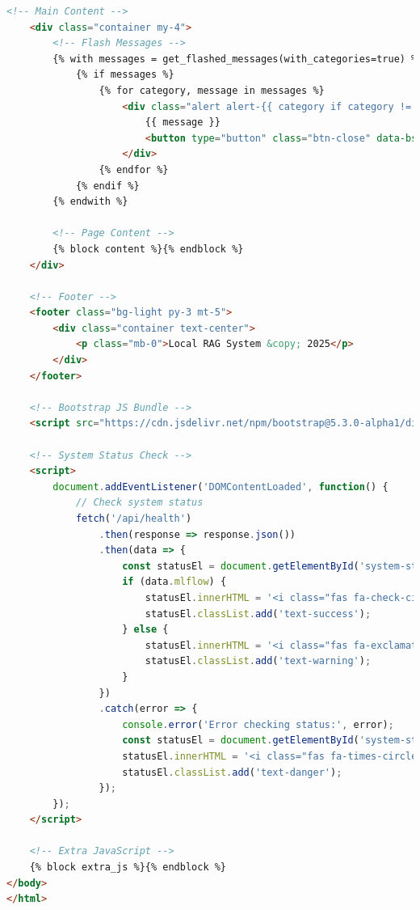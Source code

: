 \documentclass[
  screen,review,acmlarge]{acmart}
\begin{document}
\begin{lstlisting}[language=HTML]
    <!-- Main Content -->
    <div class="container my-4">
        <!-- Flash Messages -->
        {% with messages = get_flashed_messages(with_categories=true) %}
            {% if messages %}
                {% for category, message in messages %}
                    <div class="alert alert-{{ category if category != 'message' else 'info' }} alert-dismissible fade show">
                        {{ message }}
                        <button type="button" class="btn-close" data-bs-dismiss="alert"></button>
                    </div>
                {% endfor %}
            {% endif %}
        {% endwith %}
        
        <!-- Page Content -->
        {% block content %}{% endblock %}
    </div>
    
    <!-- Footer -->
    <footer class="bg-light py-3 mt-5">
        <div class="container text-center">
            <p class="mb-0">Local RAG System &copy; 2025</p>
        </div>
    </footer>
    
    <!-- Bootstrap JS Bundle -->
    <script src="https://cdn.jsdelivr.net/npm/bootstrap@5.3.0-alpha1/dist/js/bootstrap.bundle.min.js"></script>
    
    <!-- System Status Check -->
    <script>
        document.addEventListener('DOMContentLoaded', function() {
            // Check system status
            fetch('/api/health')
                .then(response => response.json())
                .then(data => {
                    const statusEl = document.getElementById('system-status');
                    if (data.mlflow) {
                        statusEl.innerHTML = '<i class="fas fa-check-circle text-success"></i> System Ready';
                        statusEl.classList.add('text-success');
                    } else {
                        statusEl.innerHTML = '<i class="fas fa-exclamation-circle text-warning"></i> MLflow Offline';
                        statusEl.classList.add('text-warning');
                    }
                })
                .catch(error => {
                    console.error('Error checking status:', error);
                    const statusEl = document.getElementById('system-status');
                    statusEl.innerHTML = '<i class="fas fa-times-circle text-danger"></i> System Error';
                    statusEl.classList.add('text-danger');
                });
        });
    </script>
    
    <!-- Extra JavaScript -->
    {% block extra_js %}{% endblock %}
</body>
</html>
\end{lstlisting}
\end{document}
